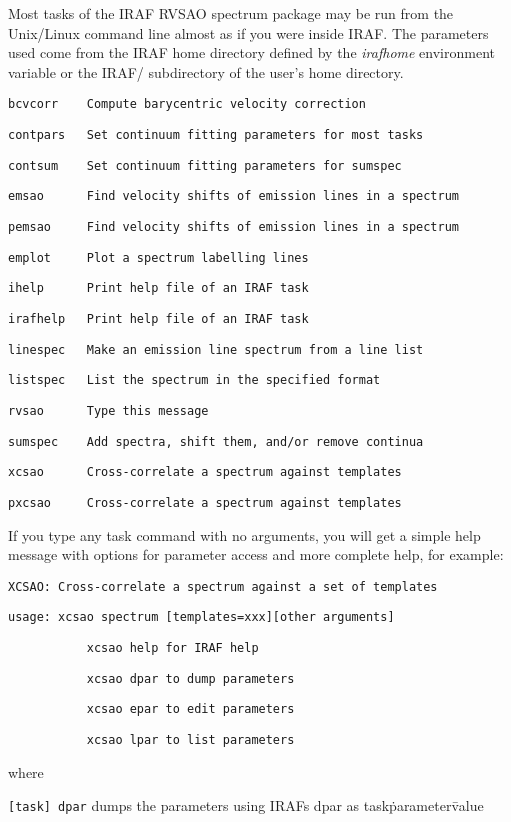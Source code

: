 Most tasks of the IRAF RVSAO spectrum package may be run from the Unix/Linux
command line almost as if you were inside IRAF. The parameters used come from the IRAF
home directory defined by the \textit{irafhome} environment variable or
the IRAF/ subdirectory of the user's home directory.

\texttt{bcvcorr~~~~Compute barycentric velocity correction}

\texttt{contpars~~~Set continuum fitting parameters for most tasks}

\texttt{contsum~~~~Set continuum fitting parameters for sumspec}

\texttt{emsao~~~~~~Find velocity shifts of emission lines in a spectrum}

\texttt{pemsao~~~~~Find velocity shifts of emission lines in a spectrum}

\texttt{emplot~~~~~Plot a spectrum labelling lines}

\texttt{ihelp~~~~~~Print help file of an IRAF task}

\texttt{irafhelp~~~Print help file of an IRAF task}

\texttt{linespec~~~Make an emission line spectrum from a line list}

\texttt{listspec~~~List the spectrum in the specified format}

\texttt{rvsao~~~~~~Type this message}

\texttt{sumspec~~~~Add spectra, shift them, and/or remove continua}

\texttt{xcsao~~~~~~Cross-correlate a spectrum against templates}

\texttt{pxcsao~~~~~Cross-correlate a spectrum against templates}

If you type any task command with no arguments, you will get a simple help
message with options for parameter access and more complete help,
for example:

\texttt{XCSAO: Cross-correlate a spectrum against a set of templates}

\texttt{usage: xcsao spectrum [templates=xxx][other arguments]}

\texttt{~~~~~~~~~~~xcsao help for IRAF help}

\texttt{~~~~~~~~~~~xcsao dpar to dump parameters}

\texttt{~~~~~~~~~~~xcsao epar to edit parameters}

\texttt{~~~~~~~~~~~xcsao lpar to list parameters}

where

\texttt{[task] dpar} dumps the parameters using IRAFs dpar as task\.parameter\=value

